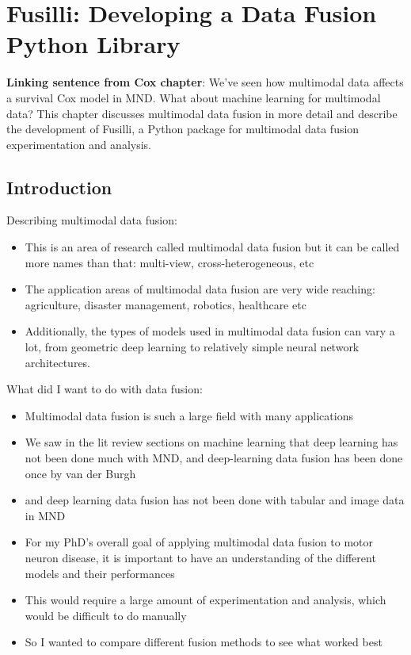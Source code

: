 \chapter{Fusilli: Developing a Data Fusion Python Library}
\label{fusilli_development}

\textbf{Linking sentence from Cox chapter}: 
We've seen how multimodal data affects a survival Cox model in MND.
What about machine learning for multimodal data?
This chapter discusses multimodal data fusion in more detail and describe the development of Fusilli, a Python package for multimodal data fusion experimentation and analysis.

\section{Introduction}


Describing multimodal data fusion:
\begin{itemize}
    \item This is an area of research called multimodal data fusion but it can be called more names than that: multi-view, cross-heterogeneous, etc
    \item The application areas of multimodal data fusion are very wide reaching: agriculture, disaster management, robotics, healthcare etc
    \item Additionally, the types of models used in multimodal data fusion can vary a lot, from geometric deep learning to relatively simple neural network architectures.
\end{itemize}

What did I want to do with data fusion:
\begin{itemize}
    \item Multimodal data fusion is such a large field with many applications
    \item We saw in the lit review sections on machine learning that deep learning has not been done much with MND, and deep-learning data fusion has been done once by van der Burgh
    \item and deep learning data fusion has not been done with tabular and image data in MND
    \item For my PhD's overall goal of applying multimodal data fusion to motor neuron disease, it is important to have an understanding of the different models and their performances
    \item This would require a large amount of experimentation and analysis, which would be difficult to do manually
    \item So I wanted to compare different fusion methods to see what worked best
\end{itemize}

